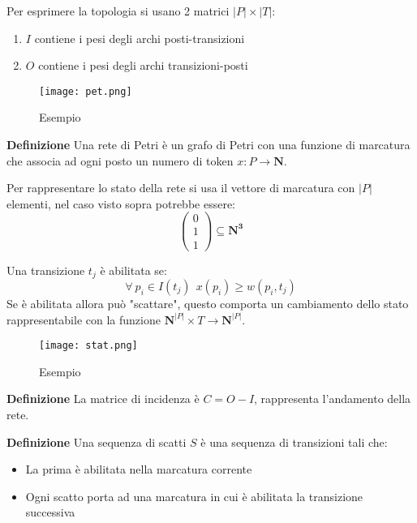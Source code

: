 \documentclass{article}
\newcommand{\df}[1]{\noindent\textbf{Definizione } #1.\newline}
\begin{document}
\noindent Per esprimere la topologia si usano 2 matrici $|P|\times|T|$:
\begin{enumerate}
    \item $I$ contiene i pesi degli archi posti-transizioni
    \item $O$ contiene i pesi degli archi transizioni-posti\newline
\end{enumerate}

\begin{figure}[ht]
    \centering
    \texttt{[image: pet.png]}
    \caption{Esempio}
\end{figure}

\df{Una rete di Petri è un grafo di Petri con una funzione di marcatura che associa ad ogni posto un numero di token $x:P\rightarrow\mathbf{N}$}

\noindent Per rappresentare lo stato della rete si usa il vettore di marcatura con $|P|$ elementi, nel caso visto sopra potrebbe essere:
\[\begin{pmatrix}
    0\\1\\1
\end{pmatrix}\subseteq\mathbf{N^3}\]\newline

\noindent Una transizione $t_j$ è abilitata se:
$$\forall\ p_i\in I(t_j)\ \ x(p_i)\geq w(p_i,t_j)$$
\noindent Se è abilitata allora può "scattare", questo comporta un cambiamento dello stato rappresentabile con la funzione $\mathbf{N}^{|P|}\times T\rightarrow\mathbf{N}^{|P|}$.\newline

\begin{figure}[ht]
    \centering
    \texttt{[image: stat.png]}
    \caption{Esempio}
\end{figure}

\df{La matrice di incidenza è $C=O-I$, rappresenta l'andamento della rete}

\noindent\textbf{Definizione} Una sequenza di scatti $S$ è una sequenza di transizioni tali che:
\begin{itemize}
    \item La prima è abilitata nella marcatura corrente
    \item Ogni scatto porta ad una marcatura in cui è abilitata la transizione successiva\newline
\end{itemize}
\end{document}
